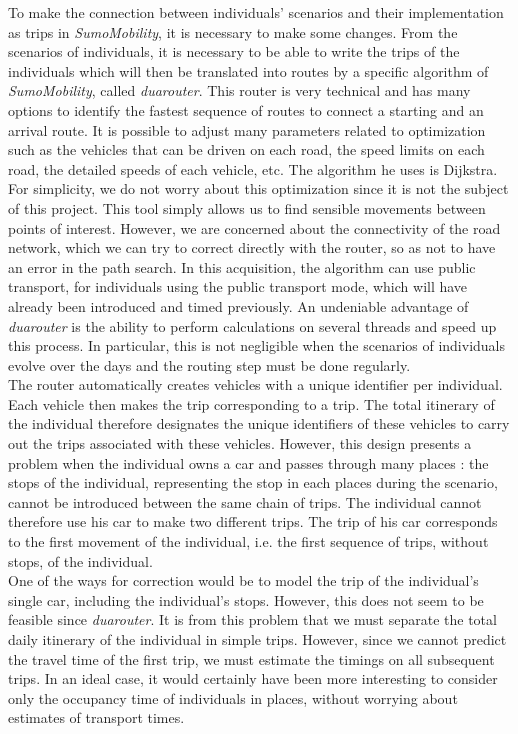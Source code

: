 To make the connection between individuals' scenarios and their implementation as trips in \textit{SumoMobility}, it is necessary to make some changes. From the scenarios of individuals, it is necessary to be able to write the trips of the individuals which will then be translated into routes by a specific algorithm of \textit{SumoMobility}, called \textit{duarouter}. This router is very technical and has many options to identify the fastest sequence of routes to connect a starting and an arrival route. It is possible to adjust many parameters related to optimization such as the vehicles that can be driven on each road, the speed limits on each road, the detailed speeds of each vehicle, etc. The algorithm he uses is Dijkstra. For simplicity, we do not worry about this optimization since it is not the subject of this project. This tool simply allows us to find sensible movements between points of interest. However, we are concerned about the connectivity of the road network, which we can try to correct directly with the router, so as not to have an error in the path search. In this acquisition, the algorithm can use public transport, for individuals using the public transport mode, which will have already been introduced and timed previously. An undeniable advantage of \textit{duarouter} is the ability to perform calculations on several threads and speed up this process. In particular, this is not negligible when the scenarios of individuals evolve over the days and the routing step must be done regularly. \\

The router automatically creates vehicles with a unique identifier per individual. Each vehicle then makes the trip corresponding to a trip. The total itinerary of the individual therefore designates the unique identifiers of these vehicles to carry out the trips associated with these vehicles. However, this design presents a problem when the individual owns a car and passes through many places : the stops of the individual, representing the stop in each places during the scenario, cannot be introduced between the same chain of trips. The individual cannot therefore use his car to make two different trips. The trip of his car corresponds to the first movement of the individual, i.e. the first sequence of trips, without stops, of the individual.\\

One of the ways for correction would be to model the trip of the individual's single car, including the individual's stops. However, this does not seem to be feasible since \textit{duarouter}. It is from this problem that we must separate the total daily itinerary of the individual in simple trips. However, since we cannot predict the travel time of the first trip, we must estimate the timings on all subsequent trips. In an ideal case, it would certainly have been more interesting to consider only the occupancy time of individuals in places, without worrying about estimates of transport times.\\

